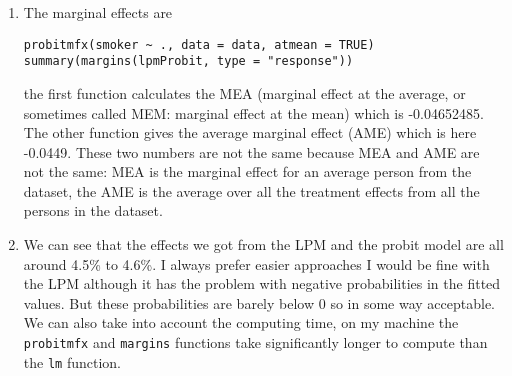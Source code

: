 \documentclass{article}
\begin{document}
\begin{enumerate}[label=(\alph*)]
		\item The marginal effects are
		\begin{lstlisting}
probitmfx(smoker ~ ., data = data, atmean = TRUE)
summary(margins(lpmProbit, type = "response"))
		\end{lstlisting}
		the first function calculates the MEA (marginal effect at the average, or sometimes called MEM: marginal effect at the mean) which is -0.04652485. The other function gives the average marginal effect (AME) which is here -0.0449. These two numbers are not the same because MEA and AME are not the same: MEA is the marginal effect for an average person from the dataset, the AME is the average over all the treatment effects from all the persons in the dataset.
		\item We can see that the effects we got from the LPM and the probit model are all around 4.5\% to 4.6\%. I always prefer easier approaches I would be fine with the LPM although it has the problem with negative probabilities in the fitted values. But these probabilities are barely below 0 so in some way acceptable. We can also take into account the computing time, on my machine the \texttt{probitmfx} and \texttt{margins} functions take significantly longer to compute than the \texttt{lm} function.
	\end{enumerate}
	
	\printbibliography 
\end{document}
